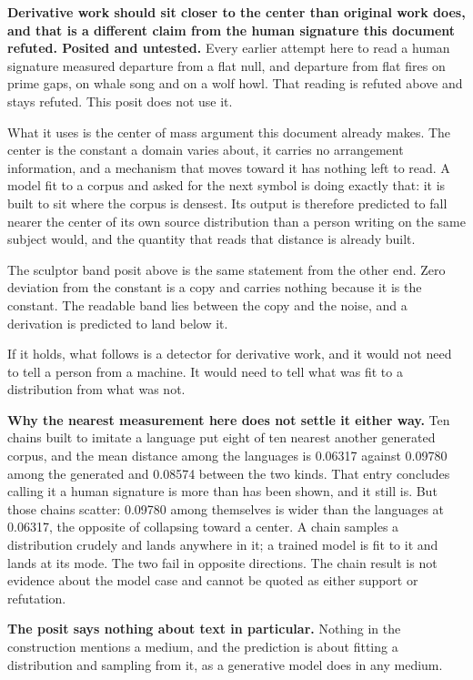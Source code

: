 \textbf{Derivative work should sit closer to the center than original work does, and that is a different claim from the human signature this document refuted. Posited and untested.} Every earlier attempt here to read a human signature measured departure from a flat null, and departure from flat fires on prime gaps, on whale song and on a wolf howl. That reading is refuted above and stays refuted. This posit does not use it.

What it uses is the center of mass argument this document already makes. The center is the constant a domain varies about, it carries no arrangement information, and a mechanism that moves toward it has nothing left to read. A model fit to a corpus and asked for the next symbol is doing exactly that: it is built to sit where the corpus is densest. Its output is therefore predicted to fall nearer the center of its own source distribution than a person writing on the same subject would, and the quantity that reads that distance is already built.

The sculptor band posit above is the same statement from the other end. Zero deviation from the constant is a copy and carries nothing because it is the constant. The readable band lies between the copy and the noise, and a derivation is predicted to land below it.

If it holds, what follows is a detector for derivative work, and it would not need to tell a person from a machine. It would need to tell what was fit to a distribution from what was not.

\textbf{Why the nearest measurement here does not settle it either way.} Ten chains built to imitate a language put eight of ten nearest another generated corpus, and the mean distance among the languages is 0.06317 against 0.09780 among the generated and 0.08574 between the two kinds. That entry concludes calling it a human signature is more than has been shown, and it still is. But those chains scatter: 0.09780 among themselves is wider than the languages at 0.06317, the opposite of collapsing toward a center. A chain samples a distribution crudely and lands anywhere in it; a trained model is fit to it and lands at its mode. The two fail in opposite directions. The chain result is not evidence about the model case and cannot be quoted as either support or refutation.

\textbf{The posit says nothing about text in particular.} Nothing in the construction mentions a medium, and the prediction is about fitting a distribution and sampling from it, as a generative model does in any medium.

